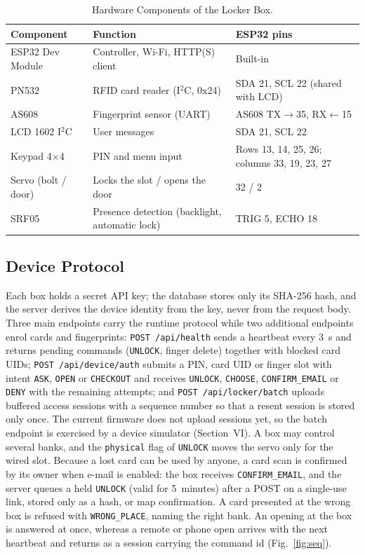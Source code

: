 \documentclass[journal,onecolumn]{IEEEtran}
\begin{document}
\begin{table}[!htbp]
\renewcommand{\arraystretch}{1.02}
\centering
\small
\caption{Hardware Components of the Locker Box.}
\label{tab:hw}
\vspace{5pt}
\begin{tabular}{l l l}
\hline
Component & Function & ESP32 pins \\
\hline
\rule{0pt}{2.6ex}ESP32 Dev Module & Controller, Wi-Fi, HTTP(S) client & Built-in \\
PN532 & RFID card reader (I$^2$C, 0x24) & SDA 21, SCL 22 (shared with LCD) \\
AS608 & Fingerprint sensor (UART) & AS608 TX$\rightarrow$35, RX$\leftarrow$15 \\
LCD 1602 I$^2$C & User messages & SDA 21, SCL 22 \\
Keypad 4$\times$4 & PIN and menu input & Rows 13, 14, 25, 26; columns 33, 19, 23, 27 \\
Servo (bolt / door) & Locks the slot / opens the door & 32 / 2 \\
SRF05 & Presence detection (backlight, automatic lock) & TRIG 5, ECHO 18 \\
\hline
\end{tabular}
\end{table}

\subsection{Device Protocol}

Each box holds a secret API key; the database stores only its SHA-256 hash, and the server derives the device
identity from the key, never from the request body. Three main endpoints carry the runtime protocol while two additional
endpoints enrol cards and fingerprints: \texttt{POST /api/health} sends a heartbeat every 3~s and returns pending
commands (\texttt{UNLOCK}, finger delete) together with blocked card UIDs; \texttt{POST /api/device/auth} submits a PIN,
card UID or finger slot with intent \texttt{ASK}, \texttt{OPEN} or \texttt{CHECKOUT} and receives \texttt{UNLOCK},
\texttt{CHOOSE}, \texttt{CONFIRM\_EMAIL} or \texttt{DENY} with the remaining attempts; and
\texttt{POST /api/locker/batch} uploads buffered access sessions with a sequence number so that a resent session is
stored only once. The current firmware does not upload sessions yet, so the batch endpoint is exercised by a device
simulator (Section~VI). A box may control several banks, and the \texttt{physical} flag of \texttt{UNLOCK} moves the
servo only for the wired slot. Because a lost card can be used by anyone, a card scan is confirmed by its owner when
e-mail is enabled: the box receives \texttt{CONFIRM\_EMAIL}, and the server queues a held \texttt{UNLOCK} (valid for
5~minutes) after a POST on a single-use link, stored only as a hash, or map confirmation. A card presented at the wrong
box is refused with \texttt{WRONG\_PLACE}, naming the right bank. An opening at the box is answered at once, whereas a
remote or phone open arrives with the next heartbeat and returns as a session carrying the command id
(Fig.~\ref{fig:seq}).
\end{document}
